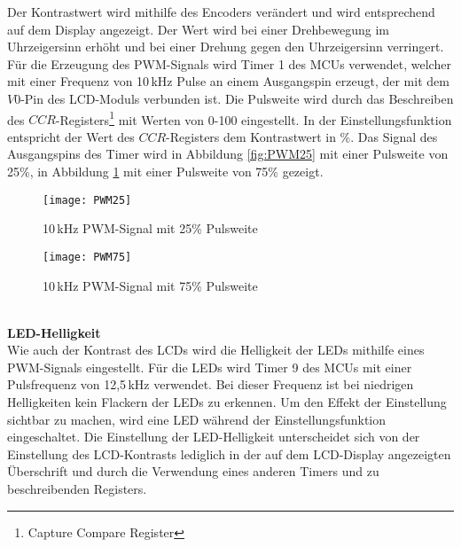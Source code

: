 Der Kontrastwert wird mithilfe des Encoders verändert und wird entsprechend auf dem Display angezeigt. Der Wert wird bei einer Drehbewegung im Uhrzeigersinn erhöht und bei einer Drehung gegen den Uhrzeigersinn verringert.\\
Für die Erzeugung des PWM-Signals wird Timer 1 des MCUs verwendet, welcher mit einer Frequenz von 10\,kHz Pulse an einem Ausgangspin erzeugt, der mit dem $V0$-Pin des LCD-Moduls verbunden ist. Die Pulsweite wird durch das Beschreiben des $CCR$-Registers\footnote{Capture Compare Register} mit Werten von 0-100 eingestellt. In der Einstellungsfunktion entspricht der Wert des $CCR$-Registers dem Kontrastwert in \%. Das Signal des Ausgangspins des Timer wird in Abbildung \ref{fig:PWM25} mit einer Pulsweite von 25\%, in Abbildung \ref{fig:PWM75} mit einer Pulsweite von 75\% gezeigt. 
\begin{figure}[h]
	\begin{minipage}{.48\linewidth}
		\centering
		\texttt{[image: PWM25]}
		\caption{10\,kHz PWM-Signal mit 25\% Pulsweite}
		\label{fig:PWM25}
	\end{minipage}
	\hfill
	\begin{minipage}{.48\linewidth}
		\centering
		\texttt{[image: PWM75]}
		\caption{10\,kHz PWM-Signal mit 75\% Pulsweite}
		\label{fig:PWM75}
	\end{minipage}
\end{figure}
\\
\newline
\textbf{LED-Helligkeit}\\
Wie auch der Kontrast des LCDs wird die Helligkeit der LEDs mithilfe eines PWM-Signals eingestellt. Für die LEDs wird Timer 9 des MCUs mit einer Pulsfrequenz von 12,5\,kHz verwendet. Bei dieser Frequenz ist bei niedrigen Helligkeiten kein Flackern der LEDs zu erkennen. Um den Effekt der Einstellung sichtbar zu machen, wird eine LED während der Einstellungsfunktion eingeschaltet. Die Einstellung der LED-Helligkeit unterscheidet sich von der Einstellung des LCD-Kontrasts lediglich in der auf dem LCD-Display angezeigten Überschrift und durch die Verwendung eines anderen Timers und zu beschreibenden Registers.
